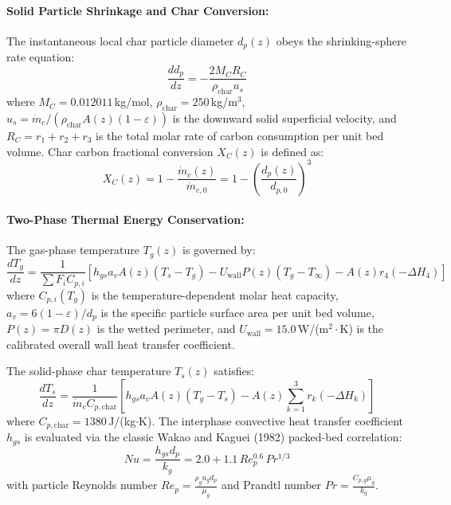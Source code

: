 \documentclass[11pt,a4paper]{article}
\begin{document}
\paragraph{Solid Particle Shrinkage and Char Conversion:}
The instantaneous local char particle diameter $d_p(z)$ obeys the shrinking-sphere rate equation:
\begin{equation}
    \frac{d d_p}{dz} = -\frac{2 M_C R_C}{\rho_{\text{char}} u_s}
    \label{eq:dp_shrink}
\end{equation}
where $M_C = 0.012011$\,kg/mol, $\rho_{\text{char}} = 250$\,kg/m$^3$, $u_s = \dot{m}_c / (\rho_{\text{char}} A(z) (1-\varepsilon))$ is the downward solid superficial velocity, and $R_C = r_1 + r_2 + r_3$ is the total molar rate of carbon consumption per unit bed volume. Char carbon fractional conversion $X_C(z)$ is defined as:
\begin{equation}
    X_C(z) = 1 - \frac{\dot{m}_c(z)}{\dot{m}_{c,0}} = 1 - \left(\frac{d_p(z)}{d_{p,0}}\right)^3
\end{equation}

\paragraph{Two-Phase Thermal Energy Conservation:}
The gas-phase temperature $T_g(z)$ is governed by:
\begin{equation}
    \frac{d T_g}{dz} = \frac{1}{\sum F_i C_{p,i}} \left[ h_{gs} a_v A(z)(T_s - T_g) - U_{\text{wall}} P(z)(T_g - T_\infty) - A(z) r_4 (-\Delta H_4) \right]
    \label{eq:energy_gas}
\end{equation}
where $C_{p,i}(T_g)$ is the temperature-dependent molar heat capacity, $a_v = 6(1-\varepsilon)/d_p$ is the specific particle surface area per unit bed volume, $P(z) = \pi D(z)$ is the wetted perimeter, and $U_{\text{wall}} = 15.0$\,W/(m$^2\cdot$K) is the calibrated overall wall heat transfer coefficient.

The solid-phase char temperature $T_s(z)$ satisfies:
\begin{equation}
    \frac{d T_s}{dz} = \frac{1}{\dot{m}_c C_{p,\text{char}}} \left[ h_{gs} a_v A(z)(T_g - T_s) - A(z) \sum_{k=1}^{3} r_k (-\Delta H_k) \right]
    \label{eq:energy_solid}
\end{equation}
where $C_{p,\text{char}} = 1380$\,J/(kg$\cdot$K). The interphase convective heat transfer coefficient $h_{gs}$ is evaluated via the classic Wakao and Kaguei (1982) packed-bed correlation:
\begin{equation}
    Nu = \frac{h_{gs} d_p}{k_g} = 2.0 + 1.1 \, Re_p^{0.6} \, Pr^{1/3}
    \label{eq:wakao}
\end{equation}
with particle Reynolds number $Re_p = \frac{\rho_g u_g d_p}{\mu_g}$ and Prandtl number $Pr = \frac{C_{p,g} \mu_g}{k_g}$.
\end{document}
